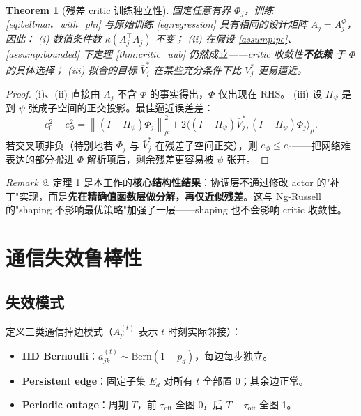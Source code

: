 \documentclass[11pt,a4paper]{article}
\newcommand{\norm}[1]{\left\lVert #1 \right\rVert}
\newcommand{\inner}[2]{\langle #1, #2 \rangle}
\newtheorem{theorem}{Theorem}
\theoremstyle{remark}
\newtheorem{remark}[theorem]{Remark}
\begin{document}
\begin{theorem}[残差 critic 训练独立性]\label{thm:residual_critic}
固定任意有界 $\Phi_j$，训练 \eqref{eq:bellman_with_phi} 与原始训练 \eqref{eq:regression} 具有相同的设计矩阵 $A_j=A_j^\Phi$，因此：
(i) 数值条件数 $\kappa(A_j^\top A_j)$ 不变；
(ii) 在假设 \ref{assump:pe}、\ref{assump:bounded} 下定理 \ref{thm:critic_uub} 仍然成立——critic 收敛性\textbf{不依赖} 于 $\Phi$ 的具体选择；
(iii) 拟合的目标 $\bar V_j^*$ 在某些充分条件下\emph{比 $V_j^*$ 更易逼近}。
\end{theorem}

\begin{proof}
(i)、(ii) 直接由 $A_j$ 不含 $\Phi$ 的事实得出，$\Phi$ 仅出现在 RHS。
(iii) 设 $\Pi_\psi$ 是到 $\psi$ 张成子空间的正交投影。最佳逼近误差差：
\begin{equation}
e_0^2-e_\Phi^2=\norm{(I-\Pi_\psi)\Phi_j}_\mu^2+2\inner{(I-\Pi_\psi)\bar V_j^*}{(I-\Pi_\psi)\Phi_j}_\mu.
\end{equation}
若交叉项非负（特别地若 $\Phi_j$ 与 $\bar V_j^*$ 在残差子空间正交），则 $e_\Phi\le e_0$——把网络难表达的部分搬进 $\Phi$ 解析项后，剩余残差更容易被 $\psi$ 张开。
\end{proof}

\begin{remark}
定理 \ref{thm:residual_critic} 是本工作的\textbf{核心结构性结果}：协调层不通过修改 actor 的"补丁"实现，而是\textbf{先在精确值函数层做分解，再仅近似残差}。这与 Ng-Russell 的"shaping 不影响最优策略"加强了一层——shaping 也不会影响 critic 收敛性。
\end{remark}

\section{通信失效鲁棒性}

\subsection{失效模式}

定义三类通信掉边模式（$A_p^{(t)}$ 表示 $t$ 时刻实际邻接）：
\begin{itemize}
\item \textbf{IID Bernoulli}：$a_{jk}^{(t)}\sim\text{Bern}(1-p_d)$，每边每步独立。
\item \textbf{Persistent edge}：固定子集 $E_d$ 对所有 $t$ 全部置 0；其余边正常。
\item \textbf{Periodic outage}：周期 $T$，前 $\tau_{\text{off}}$ 全图 0，后 $T-\tau_{\text{off}}$ 全图 1。
\end{itemize}
\end{document}
